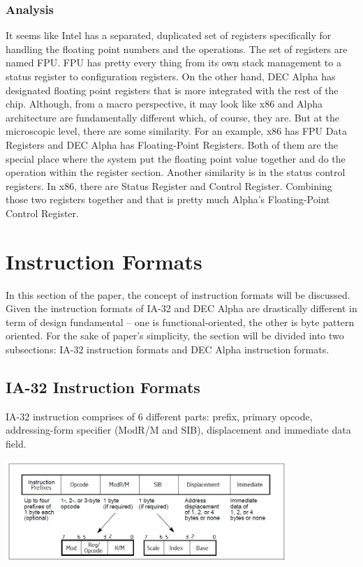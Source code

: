 \documentclass[letterpaper,10pt,titlepage]{article}
\begin{document}
\subsubsection{Analysis}
It seems like Intel has a separated, duplicated set of registers specifically 
for handling the floating point numbers and the operations. The set of 
registers are named FPU. FPU has pretty every thing from its own stack 
management to a status register to configuration registers. On the other hand,
DEC Alpha has designated floating point registers that is more integrated with 
the rest of the chip. Although, from a macro perspective, it may look like 
x86 and Alpha architecture are fundamentally different which, of course, they are.
But at the microscopic level, there are some similarity. For an example, 
x86 has FPU Data Registers and DEC Alpha has Floating-Point Registers. Both
of them are the special place where the system put the floating point value 
together and do the operation within the register section. Another similarity 
is in the status control registers. In x86, there are Status Register and 
Control Register. Combining those two registers together and that is pretty much
Alpha's Floating-Point Control Register.




\section{Instruction Formats}
In this section of the paper, the concept of instruction formats  will be
discussed. Given the instruction formats of IA-32 and DEC Alpha are drastically 
different in term of design fundamental -- one is functional-oriented, the other is
byte pattern oriented. For the sake of paper's simplicity, the section will be divided 
into two subsections: IA-32 instruction formats and DEC Alpha instruction formats. 
\subsection{IA-32 Instruction Formats}
IA-32 instruction comprises of 6 different parts: prefix, primary opcode, addressing-form
specifier (ModR/M and SIB), displacement and immediate data field. 

\begin{center}
   \includegraphics[width=0.8\textwidth]{x86_instr_format.JPG}
\end{center}
\end{document}
